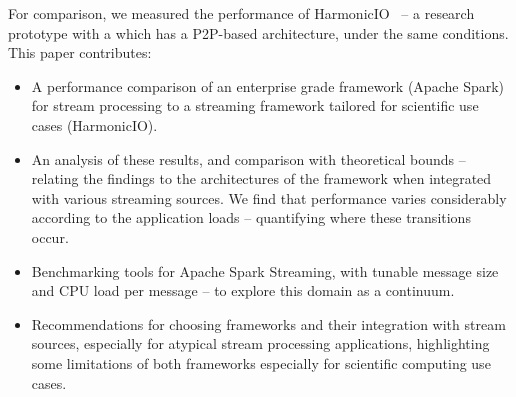 \documentclass[letterpaper,conference]{IEEEtran}
\begin{document}
For comparison, we measured the performance of HarmonicIO~\cite{torruangwatthanaHarmonicIOScalableData2018a} -- a research prototype with a which has a P2P-based architecture, under the same conditions. 
This paper contributes:

\begin{itemize}
\item A performance comparison of an enterprise grade framework (Apache Spark) for stream processing to a streaming framework tailored for scientific use cases (HarmonicIO).

\item An analysis of these results, and comparison with theoretical bounds -- relating the findings to the architectures of the framework when integrated with various streaming sources. We find that performance varies considerably according to the application loads -- quantifying where these transitions occur.

\item Benchmarking tools for Apache Spark Streaming, %
with tunable message size and CPU load per message -- to explore this domain as a continuum.

\item Recommendations for choosing frameworks and their integration with stream sources, especially for atypical stream processing applications, highlighting some 
 limitations of both frameworks especially for scientific computing use cases.  %
 
\end{itemize}


\end{document}
